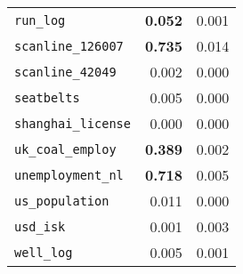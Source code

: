 \begin{tabular}{lrr}
\verb+run_log+ & \textbf{0.052} & 0.001\\
\verb+scanline_126007+ & \textbf{0.735} & 0.014\\
\verb+scanline_42049+ & 0.002 & 0.000\\
\verb+seatbelts+ & 0.005 & 0.000\\
\verb+shanghai_license+ & 0.000 & 0.000\\
\verb+uk_coal_employ+ & \textbf{0.389} & 0.002\\
\verb+unemployment_nl+ & \textbf{0.718} & 0.005\\
\verb+us_population+ & 0.011 & 0.000\\
\verb+usd_isk+ & 0.001 & 0.003\\
\verb+well_log+ & 0.005 & 0.001\\
\bottomrule
\end{tabular}